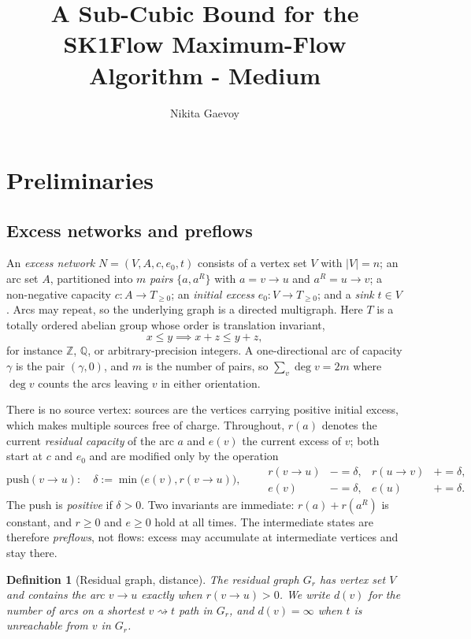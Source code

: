 \documentclass[10pt]{article}
\title{A Sub-Cubic Bound for the SK1Flow Maximum-Flow Algorithm - Medium}
\author{Nikita Gaevoy}
\date{}
\newtheorem{definition}{Definition}
\newcommand{\arc}[2]{#1\!\to\!#2}
\begin{document}
\maketitle

\section{Preliminaries}

\subsection{Excess networks and preflows}

An \emph{excess network} $N=(V,A,c,e_0,t)$ consists of a vertex set $V$ with
$|V|=n$; an arc set $A$, partitioned into $m$ \emph{pairs} $\{a,a^{R}\}$ with
$a=\arc{v}{u}$ and $a^{R}=\arc{u}{v}$; a non-negative capacity
$c\colon A\to T_{\ge0}$; an \emph{initial excess} $e_0\colon V\to T_{\ge0}$; and
a \emph{sink} $t\in V$. Arcs may repeat, so the underlying graph is a directed
multigraph. Here $T$ is a totally ordered abelian group whose order is
translation invariant,
\[
x\le y\implies x+z\le y+z,
\]
for instance $\mathbb{Z}$, $\mathbb{Q}$, or arbitrary-precision integers. A
one-directional arc of capacity $\gamma$ is the pair $(\gamma,0)$, and $m$ is
the number of pairs, so $\sum_{v}\deg v=2m$ where $\deg v$ counts the arcs
leaving $v$ in either orientation.

There is no source vertex: sources are the vertices carrying positive initial
excess, which makes multiple sources free of charge. Throughout, $r(a)$ denotes
the current \emph{residual capacity} of the arc $a$ and $e(v)$ the current
excess of $v$; both start at $c$ and $e_0$ and are modified only by the
operation
\[
  \mathrm{push}(\arc{v}{u})\colon\quad
  \delta:=\min\bigl(e(v),r(\arc{v}{u})\bigr),\qquad
  \begin{aligned}
    r(\arc{v}{u})&\mathrel{-}=\delta, & r(\arc{u}{v})&\mathrel{+}=\delta,\\
    e(v)&\mathrel{-}=\delta,          & e(u)&\mathrel{+}=\delta.
  \end{aligned}
\]
The push is \emph{positive} if $\delta>0$. Two invariants are immediate:
$r(a)+r(a^{R})$ is constant, and $r\ge0$ and $e\ge0$ hold at all times. The
intermediate states are therefore \emph{preflows}, not flows: excess may
accumulate at intermediate vertices and stay there.

\begin{definition}[Residual graph, distance]\label{def:residual}
The \emph{residual graph} $G_r$ has vertex set $V$ and contains the arc
$\arc{v}{u}$ exactly when $r(\arc{v}{u})>0$. We write $d(v)$ for the number of
arcs on a shortest $v\rightsquigarrow t$ path in $G_r$, and $d(v)=\infty$ when
$t$ is unreachable from $v$ in $G_r$.
\end{definition}
\end{document}

